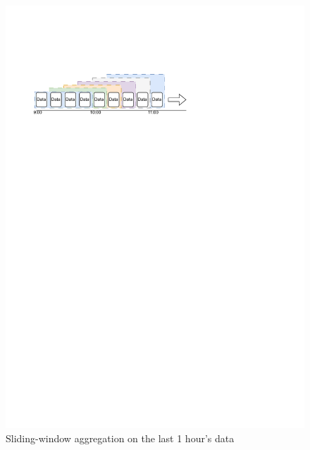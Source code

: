\begin{figure}[H]
    \centering
    \includegraphics[width=1\textwidth]{figures/sliding-window.pdf}
    \caption{Sliding-window aggregation on the last 1 hour's data}
    \label{fig_sliding_window}
\end{figure}

